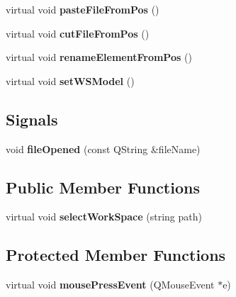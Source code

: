 \begin{DoxyCompactItemize}
\item 
\hypertarget{class_work_space_tree_a2366ecf5c2e1f041d55b7f5531eca9f3}{
virtual void {\bfseries pasteFileFromPos} ()}
\label{class_work_space_tree_a2366ecf5c2e1f041d55b7f5531eca9f3}

\item 
\hypertarget{class_work_space_tree_afc5fb1d4d2cb0e6c61f1e99d945ba953}{
virtual void {\bfseries cutFileFromPos} ()}
\label{class_work_space_tree_afc5fb1d4d2cb0e6c61f1e99d945ba953}

\item 
\hypertarget{class_work_space_tree_a806c62e116d7732f653135cf68e10e08}{
virtual void {\bfseries renameElementFromPos} ()}
\label{class_work_space_tree_a806c62e116d7732f653135cf68e10e08}

\item 
\hypertarget{class_work_space_tree_ae648af4715632227ab1c09be864de448}{
virtual void {\bfseries setWSModel} ()}
\label{class_work_space_tree_ae648af4715632227ab1c09be864de448}

\end{DoxyCompactItemize}
\subsection*{Signals}
\begin{DoxyCompactItemize}
\item 
\hypertarget{class_work_space_tree_a3f5c1fe20a819be6b031e7584636c3cd}{
void {\bfseries fileOpened} (const QString \&fileName)}
\label{class_work_space_tree_a3f5c1fe20a819be6b031e7584636c3cd}

\end{DoxyCompactItemize}
\subsection*{Public Member Functions}
\begin{DoxyCompactItemize}
\item 
\hypertarget{class_work_space_tree_ae7ee9354bd43ad1f54d42bd2db0c1adc}{
virtual void {\bfseries selectWorkSpace} (string path)}
\label{class_work_space_tree_ae7ee9354bd43ad1f54d42bd2db0c1adc}

\end{DoxyCompactItemize}
\subsection*{Protected Member Functions}
\begin{DoxyCompactItemize}
\item 
\hypertarget{class_work_space_tree_a99af4836419e5b6fd5a6511039143d22}{
virtual void {\bfseries mousePressEvent} (QMouseEvent $\ast$e)}
\label{class_work_space_tree_a99af4836419e5b6fd5a6511039143d22}

\end{DoxyCompactItemize}


